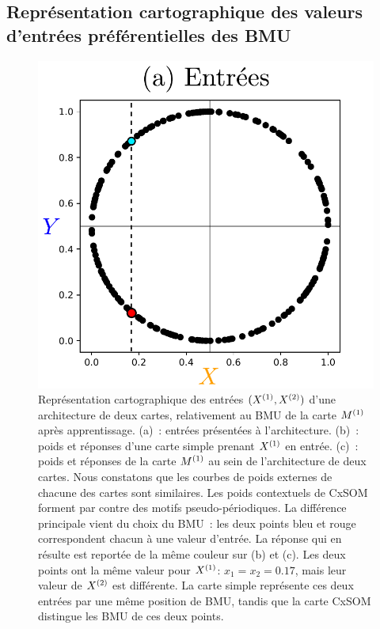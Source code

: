 \documentclass[../main]{subfiles}
\begin{document}
\subsection{Représentation cartographique des valeurs d'entrées préférentielles des BMU}

\begin{figure}
    \includegraphics[width=\textwidth]{2som_inp_noU.pdf}
    \caption{Représentation cartographique des entrées $(X^{({1})},X^{({2})})$ d'une architecture de deux cartes, relativement au BMU de la carte $M^{({1})}$ après apprentissage. 
    (a)~: entrées présentées à l'architecture. (b)~: poids et réponses d'une carte simple prenant $X^{({1})}$ en entrée. (c)~: poids et réponses de la carte $M^{({1})}$ au sein de l'architecture de deux cartes.
    Nous constatons que les courbes de poids externes de chacune des cartes sont similaires. Les poids contextuels de CxSOM forment par contre des motifs pseudo-périodiques. La différence principale vient du choix du BMU~:
    les deux points bleu et rouge correspondent chacun à une valeur d'entrée. La réponse qui en résulte est reportée de la même couleur sur (b) et (c). Les deux points ont la même valeur pour $X^{({1})}$: $x_1 = x_2 = 0.17$, mais leur valeur de $X^{({2})}$ est différente. 
    La carte simple représente ces deux entrées par une même position de BMU, tandis que la carte CxSOM distingue les BMU de ces deux points. \label{fig:inputs}}
    \end{figure}
\end{document}
